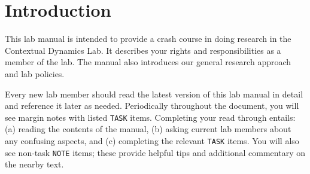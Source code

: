 \documentclass{tufte-book} %
\begin{document}




\newcommand{\director}{Jeremy}
\newcommand{\coordinator}{Paxton}
\newcommand{\labmeetingtime}{Tuesdays at 12:00pm}

\cleardoublepage
\chapter{Introduction}\label{ch:intro} %
This lab manual is intended to provide a crash course in doing
research in the Contextual Dynamics Lab.  It describes your rights and
responsibilities as a member of the lab.  The manual also introduces
our general research approach and lab policies.


\noindent {}
Every new lab member should read
the latest version of this lab manual in detail and reference it later
as needed.  Periodically throughout the document, you will see margin
notes with listed \texttt{TASK} items.  Completing your read through
entails: (a) reading the contents of the manual, (b) asking current
lab members about any confusing aspects, and (c) completing the
relevant \texttt{TASK} items.  You will also see non-task
\texttt{NOTE} items; these provide helpful tips and additional
commentary on the nearby text.
\end{document}

